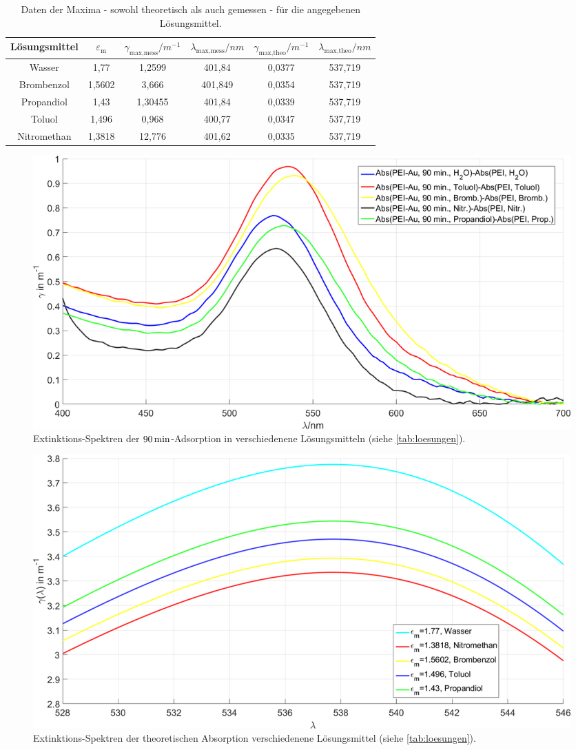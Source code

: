 \documentclass[numbers=noenddot,a4paper,notitlepage,twoside,BCOR15mm]{scrartcl}
\newcommand{\ix}[1]{_\text{#1}}
\begin{document}
				\begin{table}[H]
					\centering
					\begin{tabular}{c|c|c|c|c|c}
						Lösungsmittel & $\varepsilon\ix{m}$ & $\gamma\ix{max,mess}/\unit{m^{-1}}$ & $\lambda\ix{max,mess}/\unit{nm}$ & $\gamma\ix{max,theo}/\unit{m^{-1}}$ & $\lambda\ix{max,theo}/\unit{nm}$ \\ 
						\hline\hline Wasser & 1,77 & 1,2599 &  401,84 & 0,0377 & 537,719 \\
						\hline Brombenzol & 1,5602 & 3,666 & 401,849 & 0,0354 & 537,719 \\
						\hline Propandiol & 1,43 & 1,30455 & 401,84 & 0,0339 & 537,719 \\
						\hline Toluol & 1,496 & 0,968 & 400,77 & 0,0347 & 537,719 \\
						\hline Nitromethan & 1,3818 & 12,776 & 401,62 & 0,0335 & 537,719
					\end{tabular} 
					\caption{Daten der Maxima - sowohl theoretisch als auch gemessen - für die angegebenen Lösungsmittel.}
					\label{tab:loesungen}
				\end{table}
	
				\begin{figure}[H]
					\centering
					\includegraphics[width=\textwidth]{absorp_spektren_loesungen.png}
					\caption{Extinktions-Spektren der $\unit[90]{min}$-Adsorption in verschiedenene Lösungsmitteln (siehe \autoref{tab:loesungen}).}
					\label{img:loesgemess}
				\end{figure}
	
				\begin{figure}[H]
					\centering
					\includegraphics[width=\textwidth]{theoret_maxima_loesung.png}
					\caption{Extinktions-Spektren der theoretischen Absorption verschiedenene Lösungsmittel (siehe \autoref{tab:loesungen}).}
					\label{img:loestheo}
				\end{figure}
\end{document}
